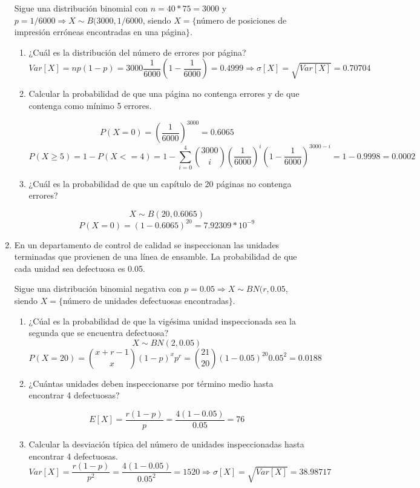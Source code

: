 \documentclass[11pt]{article}
\begin{document}
\begin{enumerate}
Sigue una distribución binomial con $n=40*75=3000$ y $p=1/6000 \Longrightarrow X \sim B(3000, 1/6000$, siendo $X=\{$número de posiciones de impresión erróneas encontradas en una página$\}$.


\begin{enumerate}
\item ¿Cuál es la distribución del número de errores por página?
\[
Var[X] = np(1-p) = 3000\frac{1}{6000}(1-\frac{1}{6000})=0.4999 \Longrightarrow \sigma [X] = \sqrt{Var[X]} = 0.70704
\]

\item Calcular la probabilidad de que una página no contenga errores y de que contenga como mínimo 5 errores.

\[
P(X=0)= (\frac{1}{6000})^{3000} = 0.6065
\]
\[
P(X \geq 5)=1 - P(X<=4) = 1 - \sum_{i=0}^4\binom{3000}{i}(\frac{1}{6000})^i(1-\frac{1}{6000})^{3000-i}=1-0.9998 = 0.0002
\]

\item ¿Cuál es la probabilidad de que un capítulo de 20 páginas no contenga errores?

\[
X \sim B(20, 0.6065)
\]
\[
P(X=0) = (1-0.6065)^{20} = 7.92309 * 10^{-9}
\]

\end{enumerate}

\item En un departamento de control de calidad se inspeccionan las unidades terminadas que provienen de una línea de ensamble. La probabilidad de que cada unidad sea defectuosa es 0.05.

Sigue una distribución binomial negativa con $p=0.05 \Longrightarrow X \sim BN(r, 0.05$, siendo $X=\{$número de unidades defectuosas encontradas$\}$.

\begin{enumerate}
\item ¿Cúal es la probabilidad de que la vigésima unidad inspeccionada sea la segunda que se encuentra defectuosa?
\[
X \sim BN(2, 0.05)
\]
\[
P(X=20) = \binom{x+r-1}{x}(1-p)^xp^r=\binom{21}{20}(1-0.05)^{20}0.05^2=0.0188
\]

\item ¿Cuántas unidades deben inspeccionarse por término medio hasta encontrar 4 defectuosas?

\[
E[X] = \frac{r(1-p)}{p}=\frac{4(1-0.05)}{0.05} = 76
\]

\item Calcular la desviación típica del número de unidades inspeccionadas hasta encontrar 4 defectuosas.
\[
Var[X] = \frac{r(1-p)}{p^2}=\frac{4(1-0.05)}{0.05^2}=1520 \Longrightarrow \sigma [X] = \sqrt{Var[X]} = 38.98717
\]


\end{enumerate}
\end{enumerate}
\end{document}

